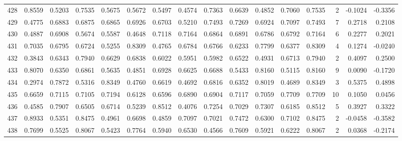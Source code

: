 \begin{tabular}{lrrrrrrrrrrrrrrr}
428 &      0.8559 &  0.5203 &  0.7535 &  0.5675 &  0.5672 &  0.5497 &  0.4574 &  0.7363 &  0.6639 &  0.4852 &   0.7060 &     0.7535 &      2 &                   -0.1024 &                    -0.3356 \\
429 &      0.4775 &  0.6883 &  0.6875 &  0.6865 &  0.6926 &  0.6703 &  0.5210 &  0.7493 &  0.7269 &  0.6924 &   0.7097 &     0.7493 &      7 &                    0.2718 &                     0.2108 \\
430 &      0.4887 &  0.6908 &  0.5674 &  0.5587 &  0.4648 &  0.7118 &  0.7164 &  0.6864 &  0.6891 &  0.6786 &   0.6792 &     0.7164 &      6 &                    0.2277 &                     0.2021 \\
431 &      0.7035 &  0.6795 &  0.6724 &  0.5255 &  0.8309 &  0.4765 &  0.6784 &  0.6766 &  0.6233 &  0.7799 &   0.6377 &     0.8309 &      4 &                    0.1274 &                    -0.0240 \\
432 &      0.3843 &  0.6343 &  0.7940 &  0.6629 &  0.6838 &  0.6022 &  0.5951 &  0.5982 &  0.6522 &  0.4931 &   0.6713 &     0.7940 &      2 &                    0.4097 &                     0.2500 \\
433 &      0.8070 &  0.6350 &  0.6861 &  0.5635 &  0.4851 &  0.6928 &  0.6625 &  0.6688 &  0.5433 &  0.8160 &   0.5115 &     0.8160 &      9 &                    0.0090 &                    -0.1720 \\
434 &      0.2974 &  0.7872 &  0.5316 &  0.8349 &  0.4760 &  0.6619 &  0.4692 &  0.6816 &  0.6352 &  0.8019 &   0.4689 &     0.8349 &      3 &                    0.5375 &                     0.4898 \\
435 &      0.6659 &  0.7115 &  0.7105 &  0.7194 &  0.6128 &  0.6596 &  0.6890 &  0.6904 &  0.7117 &  0.7059 &   0.7709 &     0.7709 &     10 &                    0.1050 &                     0.0456 \\
436 &      0.4585 &  0.7907 &  0.6505 &  0.6714 &  0.5239 &  0.8512 &  0.4076 &  0.7254 &  0.7029 &  0.7307 &   0.6185 &     0.8512 &      5 &                    0.3927 &                     0.3322 \\
437 &      0.8933 &  0.5351 &  0.8475 &  0.4961 &  0.6698 &  0.4859 &  0.7097 &  0.7021 &  0.7472 &  0.6300 &   0.7102 &     0.8475 &      2 &                   -0.0458 &                    -0.3582 \\
438 &      0.7699 &  0.5525 &  0.8067 &  0.5423 &  0.7764 &  0.5940 &  0.6530 &  0.4566 &  0.7609 &  0.5921 &   0.6222 &     0.8067 &      2 &                    0.0368 &                    -0.2174 \\

\end{tabular}

